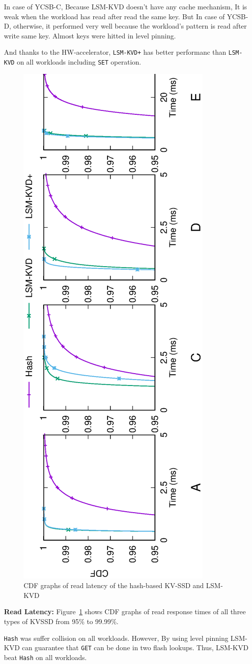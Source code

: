 \documentclass{abstract_hutech}
\newcommand{\ours}{LSM-KVD}
\begin{document}
In case of YCSB-C, Because \ours{} doesn't have any cache mechanism, It is weak when the workload has read after read the same key. 
But In case of YCSB-D, otherwise, it performed very well because the workload's pattern is read after write same key. Almost keys were hitted in level pinning.

And thanks to the HW-accelerator, \texttt{LSM-KVD+} has better performanc than \texttt{LSM-KVD} on all workloads including \texttt{SET} operation.
\begin{figure}[h]
\centering
\includegraphics[height=0.5\textwidth,angle=-90]{./exp/exp2/exp2.eps}
\caption{
CDF graphs of read latency of the hash-based KV-SSD and \ours{}
}
\label{fig:cdf}
\vspace{-10pt}
\end{figure}

\textbf{Read Latency:}
Figure~\ref{fig:cdf} shows CDF graphs of read response times of all three types of KVSSD from 95\% to 99.99\%.

\texttt{Hash} was suffer collision on all workloads. 
However, By using level pinning \ours{} can guarantee that \texttt{GET} can be done in two flash lookups.
Thus, \ours{} beat \texttt{Hash} on all workloads.

\begin{thebibliography}{99}

\end{thebibliography}

%
%
\end{document}

